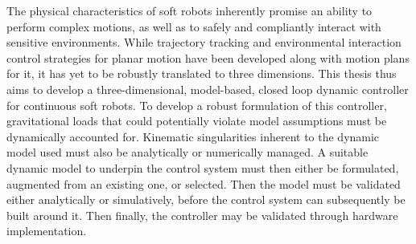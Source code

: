 
The physical characteristics of soft robots inherently promise an ability to perform complex motions, as well as to safely and compliantly interact with sensitive environments. 
While trajectory tracking and environmental interaction control strategies for planar motion have been developed along with motion plans for it, it has yet to be robustly translated to three dimensions. 
This thesis thus aims to develop a three-dimensional, model-based, closed loop dynamic controller for continuous soft robots.
To develop a robust formulation of this controller, gravitational loads that could potentially violate model assumptions must be dynamically accounted for. Kinematic singularities inherent to the dynamic model used must also be analytically or numerically managed.
A suitable dynamic model to underpin the control system must then either be formulated, augmented from an existing one, or selected. Then the model must be validated either analytically or simulatively, before the control system can subsequently be built around it. Then finally, the controller may be validated through hardware implementation.  

